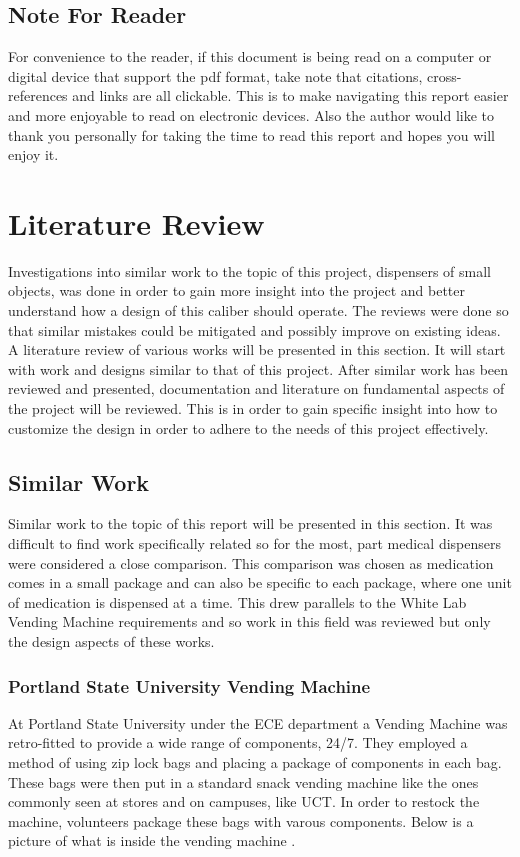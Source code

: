 \documentclass[a4paper,11pt]{article}
\numberwithin{figure}{section}
\numberwithin{table}{section}
\begin{document}
	\subsection{Note For Reader}
	For convenience to the reader, if this document is being read on a computer or digital device that support the pdf format, take note that citations, cross-references and links are all clickable. This is to make navigating this report easier and more enjoyable to read on electronic devices. Also the author would like to thank you personally for taking the time to read this report and hopes you will enjoy it.
	\newpage
\setlength{\parskip}{1em}
\section{Literature Review}
Investigations into similar work to the topic of this project, dispensers of small objects, was done in order to gain more insight into the project and better understand how a design of this caliber should operate. The reviews were done so that similar mistakes could be mitigated and possibly improve on existing ideas. A literature review of various works will be presented in this section. It will start with work and designs similar to that of this project. After similar work has been reviewed and presented, documentation and literature on fundamental aspects of the project will be reviewed. This is in order to gain specific insight into how to customize the design in order to adhere to the needs of this project effectively. 
\subsection{Similar Work}
Similar work to the topic of this report will be presented in this section. It was difficult to find work specifically related so for the most, part medical dispensers were considered a close comparison. This comparison was chosen as medication comes in a small package and can also be specific to each package, where one unit of medication is dispensed at a time. This drew parallels to the White Lab Vending Machine requirements and so work in this field was reviewed but only the design aspects of these works.

\subsubsection{Portland State University Vending Machine}
At Portland State University under the ECE department a Vending Machine was retro-fitted to provide a wide range of components, 24/7. They employed a method of using zip lock bags and placing a package of components in each bag. These bags were then put in a standard snack vending machine like the ones commonly seen at stores and on campuses, like UCT. In order to restock the machine, volunteers package these bags with varous components. Below is a picture of what is inside the vending machine \cite{PORTU,vend}.
\end{document}
